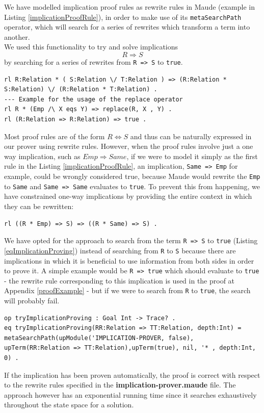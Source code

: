 \documentclass[12pt,a4paper]{article}
\begin{document}
{We have modelled implication proof rules as rewrite rules in Maude (example in Listing \ref{implicationProofRule}), in order to make use of its \texttt{metaSearchPath} operator, which will search for a series of rewrites which transform a term into another.
\\
We used this functionality to try and solve implications 
\[
	R \Rightarrow S
\]
by searching for a series of rewrites from \texttt{R => S} to \texttt{true}. 
\\ 
\begin{lstlisting}[label=implicationProofRule,caption=Example of implication rewrite rules]
rl R:Relation * ( S:Relation \/ T:Relation ) => (R:Relation * S:Relation) \/ (R:Relation * T:Relation) .
--- Example for the usage of the replace operator
rl R * (Emp /\ X eqs Y) => replace(R, X , Y) .
rl (R:Relation => R:Relation) => true .
\end{lstlisting}
Most proof rules are of the form \(R \Leftrightarrow S\) and thus can be naturally expressed in our prover using rewrite rules. However, when the proof rules involve just a one way implication, such as \(Emp \Rightarrow Same\), if we were to model it simply as the first rule in the Listing \ref{implicationProofRule}, an implication, \texttt{Same => Emp} for example, could be wrongly considered true, because Maude would rewrite the \texttt{Emp} to \texttt{Same} and \texttt{Same => Same} evaluates to \texttt{true}. To prevent this from happening, we have constrained one-way implications by providing the entire context in which they can be rewritten:
\begin{lstlisting}
rl ((R * Emp) => S) => ((R * Same) => S) .
\end{lstlisting}

We have opted for the approach to search from the term \texttt{R => S} to \texttt{true} (Listing \ref{eqImplicationProving}) instead of searching from \texttt{R} to \texttt{S} because there are implications in which it is beneficial to use information from both sides in order to prove it. A simple example would be \texttt{R => true} which should evaluate to \texttt{true} - the rewrite rule corresponding to this implication is used in the proof at Appendix \ref{proofExample} - but if we were to search from \texttt{R} to \texttt{true}, the search will probably fail.
  
\begin{lstlisting}[label=eqImplicationProving,caption=Equation using the metaSearchPath operator]
op tryImplicationProving : Goal Int -> Trace? .
eq tryImplicationProving(RR:Relation => TT:Relation, depth:Int) = metaSearchPath(upModule('IMPLICATION-PROVER, false), upTerm(RR:Relation => TT:Relation),upTerm(true), nil, '* , depth:Int, 0) . 
\end{lstlisting}
If the implication has been proven automatically, the proof is correct with respect to the rewrite rules specified in the \textbf{implication-prover.maude} file. The approach however has an exponential running time since it searches exhaustively throughout the state space for a solution. \\

}
\end{document}
